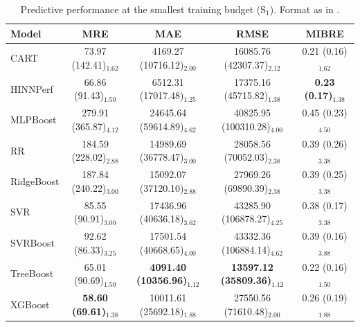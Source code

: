 \begin{table}[htbp]
\centering
\scriptsize

\caption{Predictive performance at the smallest training budget (S$_1$).
Format as in .}
\label{tab:rq1-s1}
\begin{tabular}{lcccc}
\toprule
Model & MRE & MAE & RMSE & MIBRE \\
\midrule
CART & 73.97 (142.41)$_{1.62}$ & 4169.27 (10716.12)$_{2.00}$ & 16085.76 (42307.37)$_{2.12}$ & 0.21 (0.16)$_{1.62}$ \\
HINNPerf & 66.86 (91.43)$_{1.50}$ & 6512.31 (17017.48)$_{1.25}$ & 17375.16 (45715.82)$_{1.38}$ & \textbf{0.23 (0.17)$_{1.38}$} \\
MLPBoost & 279.91 (365.87)$_{4.12}$ & 24645.64 (59614.89)$_{4.62}$ & 40825.95 (100310.28)$_{4.00}$ & 0.45 (0.23)$_{4.50}$ \\
RR & 184.59 (228.02)$_{2.88}$ & 14989.69 (36778.47)$_{3.00}$ & 28058.56 (70052.03)$_{2.38}$ & 0.39 (0.26)$_{3.38}$ \\
RidgeBoost & 187.84 (240.22)$_{3.00}$ & 15092.07 (37120.10)$_{2.88}$ & 27969.26 (69890.39)$_{2.38}$ & 0.39 (0.25)$_{3.38}$ \\
SVR & 85.55 (90.91)$_{3.00}$ & 17436.96 (40636.18)$_{3.62}$ & 43285.90 (106878.27)$_{4.25}$ & 0.38 (0.17)$_{3.38}$ \\
SVRBoost & 92.62 (86.33)$_{3.25}$ & 17501.54 (40668.65)$_{4.00}$ & 43332.36 (106884.14)$_{4.62}$ & 0.39 (0.16)$_{3.88}$ \\
TreeBoost & 65.01 (90.69)$_{1.50}$ & \textbf{4091.40 (10356.96)$_{1.12}$} & \textbf{13597.12 (35809.36)$_{1.12}$} & 0.22 (0.16)$_{1.50}$ \\
XGBoost & \textbf{58.60 (69.61)$_{1.38}$} & 10011.61 (25692.18)$_{1.88}$ & 27550.56 (71610.48)$_{2.00}$ & 0.26 (0.19)$_{1.88}$ \\
\bottomrule
\end{tabular}
\end{table}
